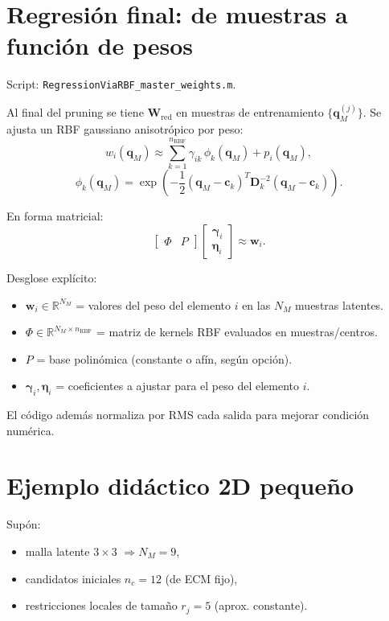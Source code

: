 \documentclass[11pt,a4paper]{article}
\newcommand{\W}{\bm W}
\newcommand{\D}{\bm D}
\begin{document}
\section{Regresi\'on final: de muestras a funci\'on de pesos}
Script: \texttt{RegressionViaRBF\_master\_weights.m}.

Al final del pruning se tiene $\W_{\text{red}}$ en muestras de entrenamiento
$\{\bm q_M^{(j)}\}$.
Se ajusta un RBF gaussiano anisotr\'opico por peso:
\[
w_i(\bm q_M)\approx
\sum_{k=1}^{n_{\text{RBF}}}\gamma_{ik}\,\phi_k(\bm q_M)+p_i(\bm q_M),
\]
\[
\phi_k(\bm q_M)=
\exp\!\left(
-\frac12(\bm q_M-\bm c_k)^T\D_k^{-2}(\bm q_M-\bm c_k)
\right).
\]

En forma matricial:
\[
\begin{bmatrix}\Phi & P\end{bmatrix}
\begin{bmatrix}\bm\gamma_i\\ \bm\eta_i\end{bmatrix}
\approx \bm w_i.
\]

Desglose expl\'icito:
\begin{itemize}[leftmargin=0.8cm]
    \item $\bm w_i\in\mathbb R^{N_M}$ = valores del peso del elemento $i$ en las $N_M$ muestras latentes.
    \item $\Phi\in\mathbb R^{N_M\times n_{\text{RBF}}}$ = matriz de kernels RBF evaluados en muestras/centros.
    \item $P$ = base polin\'omica (constante o af\'in, seg\'un opci\'on).
    \item $\bm\gamma_i,\bm\eta_i$ = coeficientes a ajustar para el peso del elemento $i$.
\end{itemize}

El c\'odigo adem\'as normaliza por RMS cada salida para mejorar condici\'on
num\'erica.

\section{Ejemplo did\'actico 2D peque\~no}
Sup\'on:
\begin{itemize}[leftmargin=0.8cm]
    \item malla latente $3\times 3$ $\Rightarrow N_M=9$,
    \item candidatos iniciales $n_c=12$ (de ECM fijo),
    \item restricciones locales de tama\~no $r_j=5$ (aprox. constante).
\end{itemize}
\end{document}
